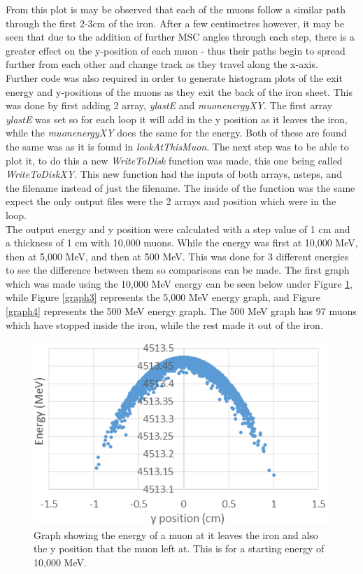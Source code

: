 \documentclass[twocolumn]{article}
\begin{document}
From this plot is may be observed that each of the muons follow a similar path through the first 2-3cm of the iron. After a few centimetres however, it may be seen that due to the addition of further MSC angles through each step, there is a greater effect on the y-position of each muon - thus their paths begin to spread further from each other and change track as they travel along the x-axis. \\\indent Further code was also required in order to generate histogram plots of the exit energy and y-positions of the muons as they exit the back of the iron sheet. This was done by first adding 2 array, \textit{ylastE} and \textit{muonenergyXY}. The first array \textit{ylastE} was set so for each loop it will add in the y position as it leaves the iron, while the \textit{muonenergyXY} does the same for the energy. Both of these are found the same was as it is found in \textit{lookAtThisMuon}. The next step was to be able to plot it, to do this a new \textit{WriteToDisk} function was made, this one being called \textit{WriteToDiskXY}. This new function had the inputs of both arrays, nsteps, and the filename instead of just the filename. The inside of the function was the same expect the only output files were the 2 arrays and position which were in the loop. \\\indent The output energy and y position were calculated with a step value of 1 cm and a thickness of 1 cm with 10,000 muons. While the energy was first at 10,000 MeV, then at 5,000 MeV, and then at 500 MeV. This was done for 3 different energies to see the difference between them so comparisons can be made. The first graph which was made using the 10,000 MeV energy can be seen below under Figure \ref{graph2}, while Figure \ref{graph3} represents the 5,000 MeV energy graph, and Figure \ref{graph4} represents the 500 MeV energy graph. The 500 MeV graph has 97 muons which have stopped inside the iron, while the rest made it out of the iron. 
\begin{figure}
	\includegraphics[scale=0.3]{Images/Graph3.png}
	\caption{\label{graph2}Graph showing the energy of a muon at it leaves the iron and also the y position that the muon left at. This is for a starting energy of 10,000 MeV.}
\end{figure}
\end{document}
